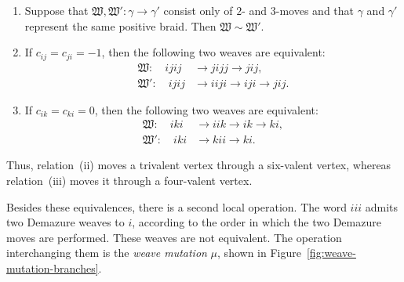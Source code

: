 \documentclass[12pt, reqno]{amsart}
\theoremstyle{plain}
\theoremstyle{definition}
\numberwithin{equation}{section}
\begin{document}
\begin{enumerate}
    \item[(i)]
    Suppose that
    \(\mathfrak W,\mathfrak W'\colon\gamma\to\gamma'\) consist only
    of \(2\)- and \(3\)-moves and that \(\gamma\) and \(\gamma'\)
    represent the same positive braid. Then
    \(\mathfrak W\sim\mathfrak W'\).

    \item[(ii)]
    If \(c_{ij}=c_{ji}=-1\), then the following two weaves are
    equivalent:
    \begin{equation*}
    \begin{aligned}
        \mathfrak W\colon\quad
        ijij&\longrightarrow jijj\longrightarrow jij,\\
        \mathfrak W'\colon\quad
        ijij&\longrightarrow iiji\longrightarrow iji
              \longrightarrow jij.
    \end{aligned}
    \end{equation*}

    \item[(iii)]
    If \(c_{ik}=c_{ki}=0\), then the following two weaves are
    equivalent:
    \begin{equation*}
    \begin{aligned}
        \mathfrak W\colon\quad
        iki&\longrightarrow iik\longrightarrow ik\longrightarrow ki,\\
        \mathfrak W'\colon\quad
        iki&\longrightarrow kii\longrightarrow ki.
    \end{aligned}
    \end{equation*}
\end{enumerate}

Thus, relation~(ii) moves a trivalent vertex through a six-valent vertex,
whereas relation~(iii) moves it through a four-valent vertex.

Besides these equivalences, there is a second local operation. The word
\(iii\) admits two Demazure weaves to \(i\), according to the order in
which the two Demazure moves are performed. These weaves are not
equivalent. The operation interchanging them is the \emph{weave mutation}
\(\mu\), shown in Figure~\ref{fig:weave-mutation-branches}.
\end{document}
